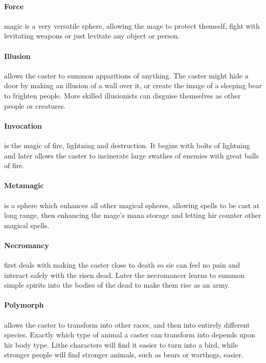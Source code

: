\begin{multicols}{2}
\paragraph{Force} magic is a very versatile sphere, allowing the mage to protect themself, fight with levitating weapons or just levitate any object or person.

\paragraph{Illusion} allows the caster to summon apparitions of anything. The caster might hide a door by making an illusion of a wall over it, or create the image of a sleeping bear to frighten people. More skilled illusionists can disguise themselves as other people or creatures.

\paragraph{Invocation} is the magic of fire, lightning and destruction. It begins with bolts of lightning and later allows the caster to incinerate large swathes of enemies with great balls of fire.

\paragraph{Metamagic} is a sphere which enhances all other magical spheres, allowing spells to be cast at long range, then enhancing the mage's mana storage and letting hir counter other magical spells.

\paragraph{Necromancy} first deals with making the caster close to death so sie can feel no pain and interact safely with the risen dead. Later the necromancer learns to summon simple spirits into the bodies of the dead to make them rise as an army.

\paragraph{Polymorph} allows the caster to transform into other races, and then into entirely different species. Exactly which type of animal a caster can transform into depends upon hir body type. Lithe characters will find it easier to turn into a bird, while stronger people will find stronger animals, such as bears or warthogs, easier.

\end{multicols}

